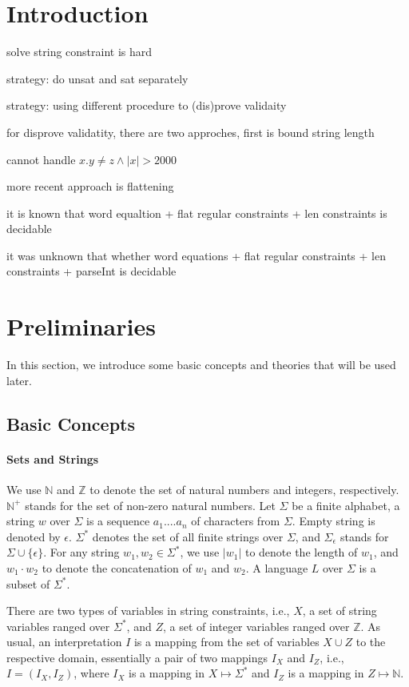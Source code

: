 \documentclass[runningheads]{llncs}
\begin{document}
\section{Introduction}

solve string constraint is hard

strategy: do unsat and sat separately

strategy: using different procedure to (dis)prove validaity

for disprove validatity, there are two approches, first is bound string length

cannot handle $x.y \neq z  \wedge |x| > 2000$

more recent approach is flattening

it is known that word equaltion + flat regular constraints + len constraints
is decidable

it was unknown that whether word equations + flat regular constraints + len constraints + parseInt is decidable



\section{Preliminaries} \label{sec:pre}

In this section, we introduce some basic concepts and theories that will be used later. 
\subsection{Basic Concepts}

\paragraph{Sets and Strings}
We use $\mathbb{N}$ and $\mathbb{Z}$ to denote the set of natural numbers and integers, respectively. 
$\mathbb{N}^+$ stands for the set of non-zero natural numbers. 
Let $\Sigma$ be a finite alphabet,
a string $w$ over $\Sigma$ is a sequence $a_1....a_n$ of characters from $\Sigma$.
Empty string is denoted by $\epsilon$.
$\Sigma^*$ denotes the set of all finite strings over $\Sigma$,
and $\Sigma_{\epsilon}$ stands for $\Sigma \cup \{\epsilon\}$.
For any string $w_1, w_2\in \Sigma^*$, 
we use $|w_1|$ to denote the length of $w_1$,
and $w_1\cdot w_2$ to denote the concatenation of $w_1$ and $w_2$.
A language $L$ over $\Sigma$ is a subset of $\Sigma^*$.

There are two types of variables in string constraints,
i.e., $X$, a set of string variables ranged over $\Sigma^*$,  
and $Z$,  a set of integer variables ranged over $\mathbb{Z}$.
As usual, an interpretation $I$ is a mapping from the set of variables $X\cup Z$ to the respective domain, 
essentially a pair of two mappings 
$I_X$ and $I_Z$, i.e., $I= (I_X, I_Z)$,  
where $I_X$ is a mapping in $X \mapsto \Sigma^*$ and $I_Z$ is a mapping in $Z \mapsto \mathbb{N}$.
\end{document}
